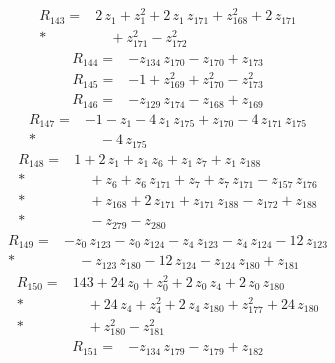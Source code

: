 \documentclass[10pt]{article}
\begin{document}
\begin{align*}
R_{143}={}& 2\,z_{1} + z_{1}^{2} + 2\,z_{1}\,z_{171} + z_{168}^{2} + 2\,z_{171} \\*
&\quad + z_{171}^{2} - z_{172}^{2}
\end{align*}
\begin{align*}
R_{144}={}& - z_{134}\,z_{170} - z_{170} + z_{173}
\end{align*}
\begin{align*}
R_{145}={}& - 1 + z_{169}^{2} + z_{170}^{2} - z_{173}^{2}
\end{align*}
\begin{align*}
R_{146}={}& - z_{129}\,z_{174} - z_{168} + z_{169}
\end{align*}
\begin{align*}
R_{147}={}& - 1 - z_{1} - 4\,z_{1}\,z_{175} + z_{170} - 4\,z_{171}\,z_{175} \\*
&\quad - 4\,z_{175}
\end{align*}
\begin{align*}
R_{148}={}& 1 + 2\,z_{1} + z_{1}\,z_{6} + z_{1}\,z_{7} + z_{1}\,z_{188} \\*
&\quad + z_{6} + z_{6}\,z_{171} + z_{7} + z_{7}\,z_{171} - z_{157}\,z_{176} \\*
&\quad + z_{168} + 2\,z_{171} + z_{171}\,z_{188} - z_{172} + z_{188} \\*
&\quad - z_{279} - z_{280}
\end{align*}
\begin{align*}
R_{149}={}& - z_{0}\,z_{123} - z_{0}\,z_{124} - z_{4}\,z_{123} - z_{4}\,z_{124} - 12\,z_{123} \\*
&\quad - z_{123}\,z_{180} - 12\,z_{124} - z_{124}\,z_{180} + z_{181}
\end{align*}
\begin{align*}
R_{150}={}& 143 + 24\,z_{0} + z_{0}^{2} + 2\,z_{0}\,z_{4} + 2\,z_{0}\,z_{180} \\*
&\quad + 24\,z_{4} + z_{4}^{2} + 2\,z_{4}\,z_{180} + z_{177}^{2} + 24\,z_{180} \\*
&\quad + z_{180}^{2} - z_{181}^{2}
\end{align*}
\begin{align*}
R_{151}={}& - z_{134}\,z_{179} - z_{179} + z_{182}
\end{align*}
\end{document}
